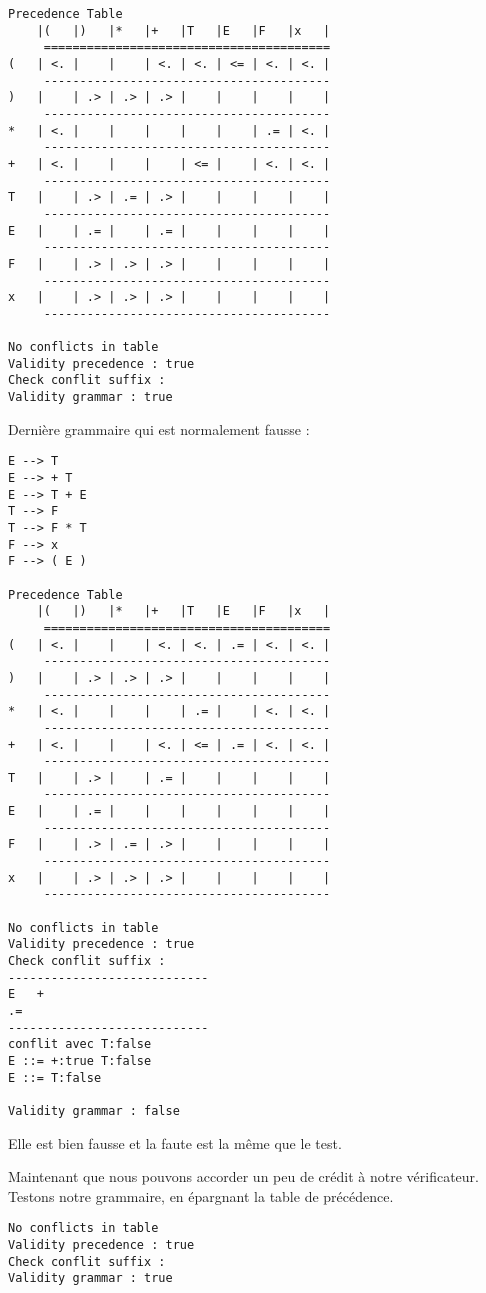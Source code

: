 \begin{verbatim}
Precedence Table
    |(   |)   |*   |+   |T   |E   |F   |x   |
     ========================================
(   | <. |    |    | <. | <. | <= | <. | <. |
     ----------------------------------------
)   |    | .> | .> | .> |    |    |    |    |
     ----------------------------------------
*   | <. |    |    |    |    |    | .= | <. |
     ----------------------------------------
+   | <. |    |    |    | <= |    | <. | <. |
     ----------------------------------------
T   |    | .> | .= | .> |    |    |    |    |
     ----------------------------------------
E   |    | .= |    | .= |    |    |    |    |
     ----------------------------------------
F   |    | .> | .> | .> |    |    |    |    |
     ----------------------------------------
x   |    | .> | .> | .> |    |    |    |    |
     ----------------------------------------

No conflicts in table
Validity precedence : true
Check conflit suffix : 
Validity grammar : true
\end{verbatim}



Dernière grammaire qui est normalement fausse :
\begin{verbatim}
E --> T 
E --> + T 
E --> T + E 
T --> F 
T --> F * T 
F --> x 
F --> ( E ) 

Precedence Table
    |(   |)   |*   |+   |T   |E   |F   |x   |
     ========================================
(   | <. |    |    | <. | <. | .= | <. | <. |
     ----------------------------------------
)   |    | .> | .> | .> |    |    |    |    |
     ----------------------------------------
*   | <. |    |    |    | .= |    | <. | <. |
     ----------------------------------------
+   | <. |    |    | <. | <= | .= | <. | <. |
     ----------------------------------------
T   |    | .> |    | .= |    |    |    |    |
     ----------------------------------------
E   |    | .= |    |    |    |    |    |    |
     ----------------------------------------
F   |    | .> | .= | .> |    |    |    |    |
     ----------------------------------------
x   |    | .> | .> | .> |    |    |    |    |
     ----------------------------------------

No conflicts in table
Validity precedence : true
Check conflit suffix : 
----------------------------
E   +
.=
----------------------------
conflit avec T:false
E ::= +:true T:false
E ::= T:false 

Validity grammar : false
\end{verbatim}
Elle est bien fausse et la faute est la même que le test.



Maintenant que nous pouvons accorder un peu de crédit à notre vérificateur. Testons notre grammaire,
en épargnant la table de précédence.
\begin{verbatim}
No conflicts in table
Validity precedence : true
Check conflit suffix : 
Validity grammar : true
\end{verbatim}